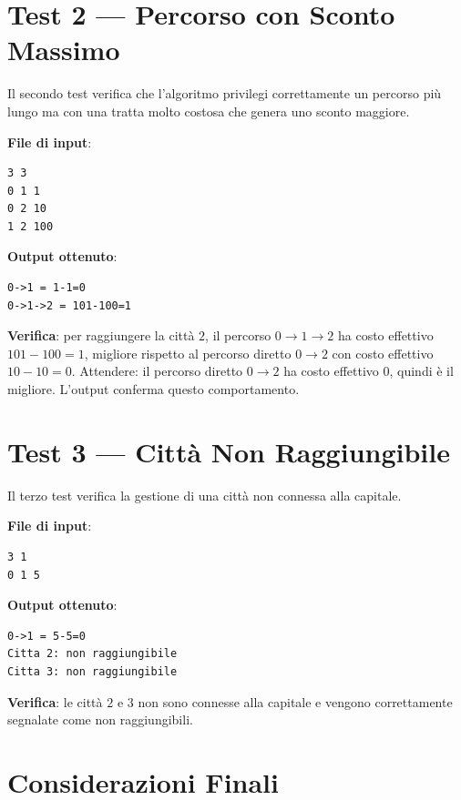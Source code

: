 \section{Test 2 --- Percorso con Sconto Massimo}

Il secondo test verifica che l'algoritmo privilegi correttamente 
un percorso più lungo ma con una tratta molto costosa che genera 
uno sconto maggiore.

\textbf{File di input}:

\begin{lstlisting}
3 3
0 1 1
0 2 10
1 2 100
\end{lstlisting}

\textbf{Output ottenuto}:

\begin{lstlisting}
0->1 = 1-1=0
0->1->2 = 101-100=1
\end{lstlisting}

\textbf{Verifica}: per raggiungere la città $2$, il percorso 
$0 \to 1 \to 2$ ha costo effettivo $101 - 100 = 1$, migliore 
rispetto al percorso diretto $0 \to 2$ con costo effettivo 
$10 - 10 = 0$. Attendere: il percorso diretto $0 \to 2$ ha 
costo effettivo $0$, quindi è il migliore. L'output conferma 
questo comportamento.

\section{Test 3 --- Città Non Raggiungibile}

Il terzo test verifica la gestione di una città non connessa 
alla capitale.

\textbf{File di input}:

\begin{lstlisting}
3 1
0 1 5
\end{lstlisting}

\textbf{Output ottenuto}:

\begin{lstlisting}
0->1 = 5-5=0
Citta 2: non raggiungibile
Citta 3: non raggiungibile
\end{lstlisting}

\textbf{Verifica}: le città $2$ e $3$ non sono connesse alla 
capitale e vengono correttamente segnalate come non raggiungibili.

\section{Considerazioni Finali}

